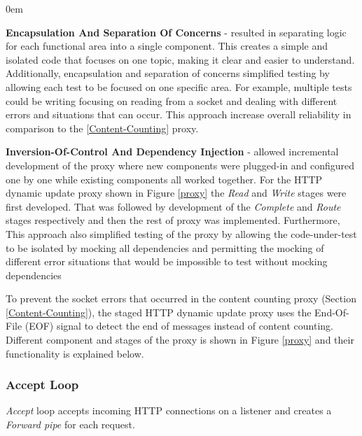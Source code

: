 \documentclass[a4paper,11pt,twoside]{report}
\begin{document}
\begin{list}{-}{}
  \itemsep0em
  \item\textbf{Encapsulation And Separation Of Concerns} - resulted in separating logic for each functional area into a single component. This creates a simple and isolated code that focuses on one topic, making it clear and easier to understand. Additionally, encapsulation and separation of concerns simplified testing by allowing each test to be focused on one specific area. For example, multiple tests could be writing focusing on reading from a socket and dealing with different errors and situations that can occur.  This approach increase overall reliability in comparison to the \ref{Content-Counting} proxy. 

  \item\textbf{Inversion-Of-Control And Dependency Injection} - allowed incremental development of the proxy where new components were plugged-in and configured one by one while existing components all worked together. For the HTTP dynamic update proxy shown in Figure \ref{proxy} the \textit{Read} and \textit{Write} stages were first developed. That was followed by development of the  \textit{Complete} and \textit{Route} stages respectively and then the rest of proxy was implemented. Furthermore, This approach also simplified testing of the proxy by allowing the code-under-test to be isolated by mocking all dependencies and permitting the mocking of different error situations that would be impossible to test without mocking dependencies  
\end{list}

\noindent
To prevent the socket errors that occurred in the content counting proxy (Section \ref{Content-Counting}), the staged HTTP dynamic update proxy uses the End-Of-File (EOF) signal to detect the end of messages instead of content counting. Different component and stages of the proxy is shown in Figure \ref{proxy} and their functionality is explained below.

\subsubsection*{Accept Loop} 
\textit{Accept} loop accepts incoming HTTP connections on a listener and creates a \textit{Forward pipe} for each request.
\end{document}
